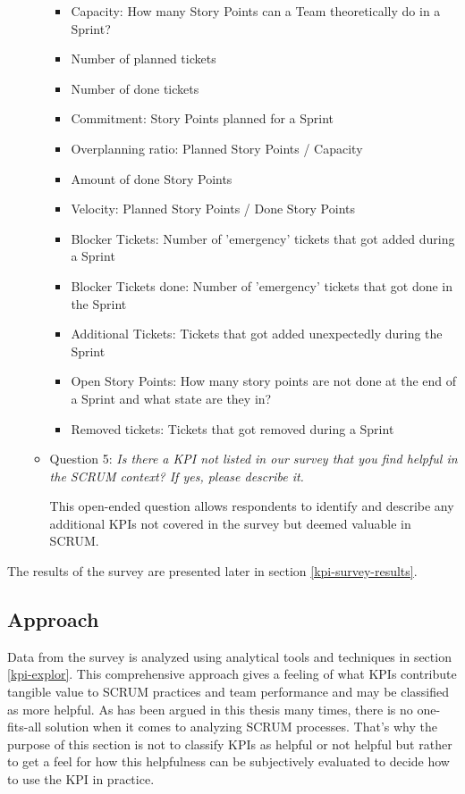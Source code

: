 \begin{itemize}
\begin{itemize}
        \begin{itemize}
            \item Capacity: How many Story Points can a Team theoretically do in a Sprint?
            \item Number of planned tickets
            \item Number of done tickets
            \item Commitment: Story Points planned for a Sprint
            \item Overplanning ratio: Planned Story Points / Capacity
            \item Amount of done Story Points
            \item Velocity: Planned Story Points / Done Story Points
            \item Blocker Tickets: Number of 'emergency' tickets that got added during a Sprint
            \item Blocker Tickets done: Number of 'emergency' tickets that got done in the Sprint
            \item Additional Tickets: Tickets that got added unexpectedly during the Sprint
            \item Open Story Points: How many story points are not done at the end of a Sprint and what state are they in?
            \item Removed tickets: Tickets that got removed during a Sprint
        \end{itemize}

        \item Question 5: \textit{Is there a KPI not listed in our survey that you find helpful in the SCRUM context? If yes, please describe it.}

        This open-ended question allows respondents to identify and describe any additional KPIs not covered in the survey but deemed valuable in SCRUM.
    \end{itemize}
\end{itemize}

The results of the survey are presented later in section \ref{kpi-survey-results}.

\subsection{Approach}\label{approach-kpi-explore}

Data from the survey is analyzed using analytical tools and techniques in section \ref{kpi-explor}.
This comprehensive approach gives a feeling of what 
KPIs contribute tangible value to SCRUM practices and 
team performance and may be classified as more helpful. 
As has been argued in this thesis many times, 
there is no one-fits-all solution when it comes to analyzing SCRUM processes. 
That's why the purpose of this section is not to classify 
KPIs as helpful or not helpful but rather to get a feel for how this 
helpfulness can be subjectively evaluated to 
decide how to use the KPI in practice. 

